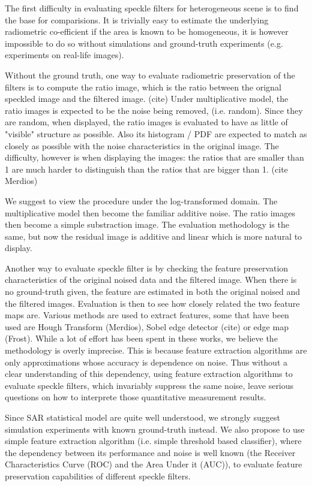 The first difficulty in evaluating speckle filters for heterogeneous scene is to find the base for comparisions.
It is trivially easy to estimate the underlying radiometric co-efficient if the area is known to be homogeneous, it is however impossible to do so without simulations and ground-truth experiments (e.g. experiments on real-life images).

Without the ground truth, one way to evaluate radiometric preservation of the filters is to compute the ratio image, which is the ratio between the orignal speckled image and the filtered image. (cite)
Under multiplicative model, the ratio images is expected to be the noise being removed, (i.e. random).
Since they are random, when displayed, the ratio images is evaluated to have as little of "visible" structure as possible.
Also its histogram / PDF are expected to match as closely as possible with the noise characteristics in the original image.
The difficulty, however is when displaying the images: the ratios that are smaller than 1 are much harder to distinguish than the ratios that are bigger than 1. (cite Merdios)

We suggest to view the procedure under the log-transformed domain. 
The multiplicative model then become the familiar additive noise.
The ratio images then become a simple substraction image. 
The evaluation methodology is the same, but now the residual image is additive and linear which is more natural to display.

Another way to evaluate speckle filter is by checking the feature preservation characteristics of the original noised data and the filtered image.
When there is no ground-truth given, the feature are estimated in both the original noised and the filtered images.
Evaluation is then to see how closely related the two feature maps are.
Various methods are used to extract features, some that have been used are Hough Transform (Merdios), Sobel edge detector (cite) or edge map (Frost).
While a lot of effort has been spent in these works, we believe the methodology is overly imprecise.
This is because feature extraction algorithms are only approximations whose accuracy is dependence on noise.
Thus without a clear understanding of this dependency, using feature extraction algorithms to evaluate speckle filters, which invariably suppress the same noise, 
	leave serious questions on how to interprete those quantitative measurement results.


Since SAR statistical model are quite well understood, we strongly suggest simulation experiments with known ground-truth instead.
We also propose to use simple feature extraction algorithm (i.e. simple threshold based classifier), where the dependency between its performance and noise is well known (the Receiver Characteristics Curve (ROC) and the Area Under it (AUC)), to evaluate feature preservation capabilities of different speckle filters.


